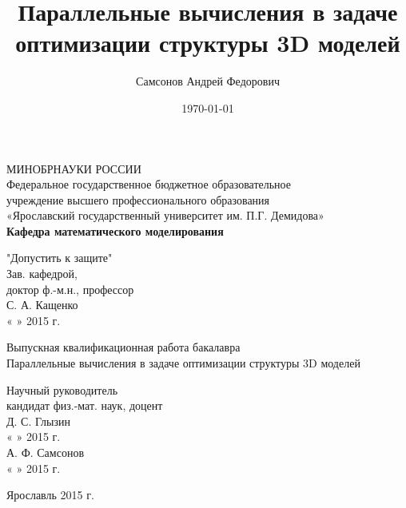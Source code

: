 \title{Параллельные вычисления в задаче оптимизации структуры 3D моделей}
\author{Самсонов Андрей Федорович}
\date{\today}

\titlepage
\begin{center}
МИНОБРНАУКИ РОССИИ\\
\vspace{0.5cm}
Федеральное государственное бюджетное образовательное\\
учреждение высшего профессионального образования\\
«Ярославский государственный университет им. П.Г. Демидова»\\
\vspace{0.5cm}
{\bf Кафедра математического моделирования}\\
\end{center}

\begin{flushright}
"Допустить к защите"\\
Зав. кафедрой,\\
доктор ф.-м.н., профессор\\
\underline{\phantom{aaaaaaaaaaaa}} С. А. Кащенко\\
«
\underline{\phantom{aaa}}
»
\underline{\phantom{aaaaaaaaaaaaa}} 2015 г.\\
\end{flushright}

\begin{center}
\vspace{3cm}
Выпускная квалификационная работа бакалавра\\
\vspace{0.5cm}
Параллельные вычисления в задаче оптимизации структуры 3D моделей\\
\vspace{3cm}
\end{center}

\begin{flushright}
Научный руководитель\\
кандидат физ.-мат. наук, доцент\\
\underline{\phantom{aaaaaааaaaaaa}} Д. С. Глызин\\
«
\underline{\phantom{aaa}}
»
\underline{\phantom{aaaaaaaaaaaaa}} 2015 г.\\
\vspace{0.5cm}
\underline{\phantom{aaaaaaaaaaa}} А. Ф. Самсонов\\
«
\underline{\phantom{aaa}}
»
\underline{\phantom{aaaaaaaaaaaaaa}}2015 г.\\
\vspace{2.5cm}
\begin{center}
Ярославль 2015 г.
\end{center}
\end{flushright}